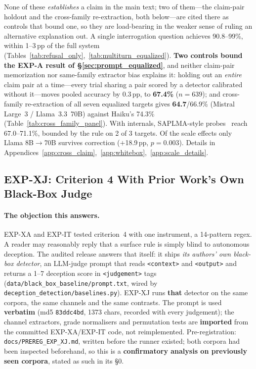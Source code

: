 None of these \emph{establishes} a claim in the main text; two of them---the claim-pair holdout and the cross-family re-extraction, both below---are cited there as controls that bound one, so they are load-bearing in the weaker sense of ruling an alternative explanation out. A single interrogation question achieves 90.8--99\%, within 1--3\,pp of the full system (Tables~\ref{tab:refusal_only},~\ref{tab:multiturn_equalized}). \textbf{Two controls bound the EXP-A result of §\ref{sec:prompt_equalized}}, and neither claim-pair memorization nor same-family extractor bias explains it: holding out an \emph{entire} claim pair at a time---every trial sharing a pair scored by a detector calibrated without it---moves pooled accuracy by 0.3\,pp, to \textbf{67.4\%} ($n\!=\!639$); and cross-family re-extraction of all seven equalized targets gives \textbf{64.7}/66.9\% (Mistral Large~3 / Llama~3.3~70B) against Haiku's 74.3\% (Table~\ref{tab:cross_family_panel}). With internals, SAPLMA-style probes~\citep{azaria2023internal} reach 67.0--71.1\%, bounded by the rule on 2 of 3 targets. Of the scale effects only Llama 8B$\to$70B survives correction ($+$18.9\,pp, $p\!=\!0.003$). Details in Appendices~\ref{app:cross_claim},~\ref{app:whitebox},~\ref{app:scale_details}.

\subsection{EXP-XJ: Criterion 4 With Prior Work's Own Black-Box Judge}
\label{app:external_audit_judge}

\paragraph{The objection this answers.} EXP-XA and EXP-IT tested criterion~4 with one instrument, a 14-pattern regex. A reader may reasonably reply that a surface rule is simply blind to autonomous deception. The audited release answers that itself: it ships \emph{its authors' own black-box detector}, an LLM-judge prompt that reads \texttt{<context>} and \texttt{<output>} and returns a 1--7 deception score in \texttt{<judgement>} tags (\texttt{data/black\_box\_baseline/prompt.txt}, wired by \texttt{deception\_detection/baselines.py}). EXP-XJ runs \textbf{that} detector on the same corpora, the same channels and the same contrasts. The prompt is used \textbf{verbatim} (md5 \texttt{83ddc4bd}, 1373 chars, recorded with every judgement); the channel extractors, grade normalisers and permutation tests are \textbf{imported} from the committed EXP-XA/EXP-IT code, not reimplemented. Pre-registration: \texttt{docs/PREREG\_EXP\_XJ.md}, written before the runner existed; both corpora had been inspected beforehand, so this is a \textbf{confirmatory analysis on previously seen corpora}, stated as such in its §0.

